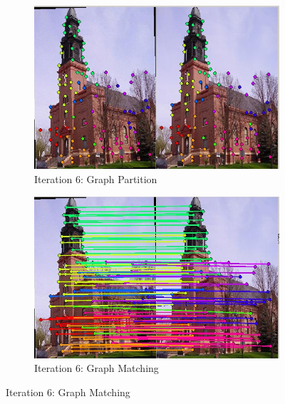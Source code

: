 \documentclass[
	fontsize=12pt,
	paper=a4,
	twoside=false,
	numbers=noenddot,
	plainheadsepline,
	toc=listof,
	toc=bibliography
]{scrartcl}
\begin{document}
\begin{figure}[ht] 
	\ContinuedFloat
	\begin{subfigure}[b]{0.5\textwidth}
		\centering
		\includegraphics[scale=0.35]{fig/method2/test_imagetrafo1/partition_it6.jpg} 
		\caption{Iteration $6$: Graph Partition} 
	\end{subfigure}%
	\begin{subfigure}[b]{0.5\textwidth}
		\centering
		\includegraphics[scale=0.35]{fig/method2/test_imagetrafo1/LL_it6.jpg} 
		\caption{Iteration $6$: Graph Matching} 
	\end{subfigure} 


\end{figure}
\end{document}
